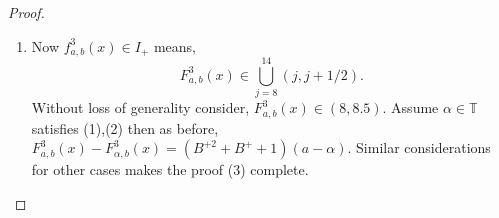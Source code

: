 \documentclass[10pt,a4paper]{amsart}
\begin{document}
\begin{proof}
\begin{enumerate}
    \vspace{.3cm}

    \item Now $f_{a,b}^3(x) \in I_+$ means, \[
    F_{a,b}^3(x) \in \bigcup_{j=8}^{14}(j,j+1/2).
    \]
    Without loss of generality consider, $F_{a,b}^3(x) \in (8,8.5)$. Assume $\alpha \in \mathbb{T}$ satisfies (1),(2) then as before, $F_{a,b}^3(x)-F_{\alpha,b}^3(x)=(B^{+{2}}+B^++1)(a-\alpha)$. Similar considerations for other cases makes the proof (3) complete.
\end{enumerate}
 
\end{proof}
\end{document}

